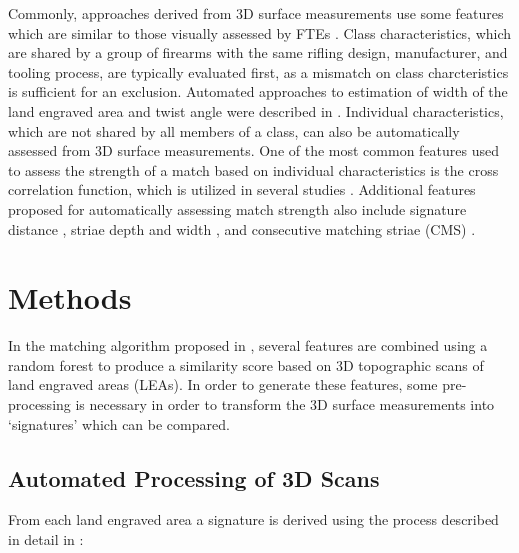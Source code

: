 \documentclass[doubleblind]{elsarticle}\usepackage[]{graphicx}\usepackage[]{color}
\begin{document}
Commonly, approaches derived from 3D surface measurements use some features which are similar to those visually assessed by FTEs \citep{luAutomatedBulletIdentification2014}. Class characteristics, which are shared by a group of firearms with the same rifling design, manufacturer, and tooling process, are typically evaluated first, as a mismatch on class charcteristics is sufficient for an exclusion. Automated approaches to estimation of width of the land engraved area and twist angle were described in \citet{chuPilotStudyAutomated2010}. Individual characteristics, which are not shared by all members of a class, can also be automatically assessed from 3D surface measurements. One of the most common features used to assess the strength of a match based on individual characteristics is the cross correlation function, which is utilized in several studies \citep{maNISTBulletSignature2004, vorburgerApplicationsCrosscorrelationFunctions2011, chuPilotStudyAutomated2010}. Additional features proposed for automatically assessing match strength also include signature distance \citep{maNISTBulletSignature2004}, striae depth and width \citep{ComputerIdentificationBullets1978}, and consecutive matching striae (CMS) \citep{chuAutomaticIdentificationBullet2013}.

\section{Methods}

In the matching algorithm proposed in \citet{aoas2}, several features are combined using a random forest \citep{breiman} to produce a similarity score based on 3D topographic scans of land engraved areas (LEAs). In order to generate these features, some pre-processing is necessary in order to transform the 3D surface measurements into `signatures' which can be compared.

\subsection{Automated Processing of 3D Scans}

From each land engraved area a signature is derived using the process described in detail in \citet{aoas2}:
\end{document}
